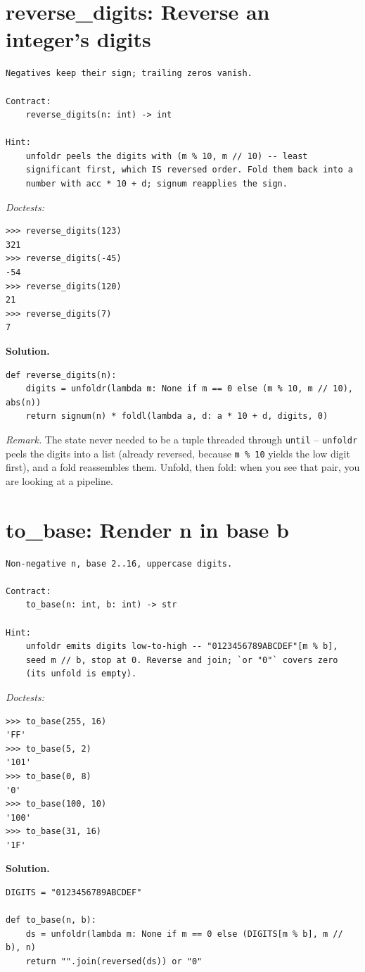 \documentclass[11pt,letterpaper]{book}
\begin{document}
\section{reverse\_digits: Reverse an integer's digits}
\begin{lstlisting}[style=spec]
Negatives keep their sign; trailing zeros vanish.

Contract:
    reverse_digits(n: int) -> int

Hint:
    unfoldr peels the digits with (m % 10, m // 10) -- least
    significant first, which IS reversed order. Fold them back into a
    number with acc * 10 + d; signum reapplies the sign.
\end{lstlisting}
\noindent\textit{Doctests:}
\begin{lstlisting}[style=spec]
>>> reverse_digits(123)
321
>>> reverse_digits(-45)
-54
>>> reverse_digits(120)
21
>>> reverse_digits(7)
7
\end{lstlisting}
\noindent\textbf{Solution.}
\begin{lstlisting}[style=code]
def reverse_digits(n):
    digits = unfoldr(lambda m: None if m == 0 else (m % 10, m // 10), abs(n))
    return signum(n) * foldl(lambda a, d: a * 10 + d, digits, 0)
\end{lstlisting}

\noindent\textit{Remark.} The state never needed to be a tuple threaded through
\texttt{until} -- \texttt{unfoldr} peels the digits into a list (already reversed,
because \texttt{m \% 10} yields the low digit first), and a fold reassembles them.
Unfold, then fold: when you see that pair, you are looking at a pipeline.

\section{to\_base: Render n in base b}
\begin{lstlisting}[style=spec]
Non-negative n, base 2..16, uppercase digits.

Contract:
    to_base(n: int, b: int) -> str

Hint:
    unfoldr emits digits low-to-high -- "0123456789ABCDEF"[m % b],
    seed m // b, stop at 0. Reverse and join; `or "0"` covers zero
    (its unfold is empty).
\end{lstlisting}
\noindent\textit{Doctests:}
\begin{lstlisting}[style=spec]
>>> to_base(255, 16)
'FF'
>>> to_base(5, 2)
'101'
>>> to_base(0, 8)
'0'
>>> to_base(100, 10)
'100'
>>> to_base(31, 16)
'1F'
\end{lstlisting}
\noindent\textbf{Solution.}
\begin{lstlisting}[style=code]
DIGITS = "0123456789ABCDEF"

def to_base(n, b):
    ds = unfoldr(lambda m: None if m == 0 else (DIGITS[m % b], m // b), n)
    return "".join(reversed(ds)) or "0"
\end{lstlisting}
\end{document}
